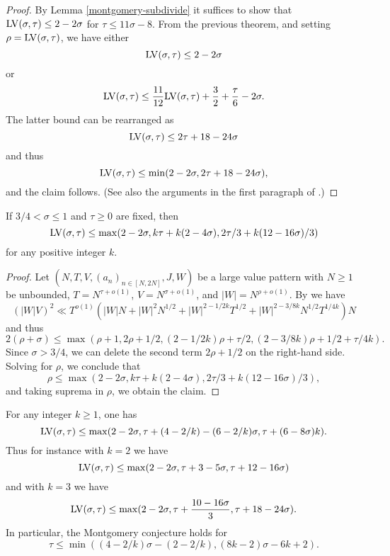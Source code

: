 \begin{proof}  By Lemma \ref{montgomery-subdivide} it suffices to show that $\mathrm{LV}(\sigma,\tau) \leq 2-2\sigma$ for $\tau \leq 11\sigma-8$.  From the previous theorem, and setting $\rho = \mathrm{LV}(\sigma,\tau)$, we have either
$$ \mathrm{LV}(\sigma,\tau) \leq 2-2\sigma$$
or
$$ \mathrm{LV}(\sigma,\tau) \leq \frac{11}{12}\mathrm{LV}(\sigma,\tau) + \frac{3}{2} + \frac{\tau}{6} - 2\sigma.$$
The latter bound can be rearranged as
$$ \mathrm{LV}(\sigma,\tau) \leq 2\tau + 18 - 24\sigma$$
and thus
$$ \mathrm{LV}(\sigma,\tau) \leq \min( 2-2\sigma, 2\tau + 18 - 24\sigma),$$
and the claim follows.  (See also the arguments in the first paragraph of \cite[p. 226]{heathbrown_zero_1979}.)
\end{proof}


\begin{lemma}\label{hb-lvt-2} If $3/4 < \sigma \leq 1$ and $\tau \geq 0$ are fixed, then
    $$ \mathrm{LV}(\sigma,\tau) \leq \max( 2-2\sigma, k\tau + k(2-4\sigma), 2\tau/3 + k(12-16\sigma)/3 )$$
    for any positive integer $k$.
    \end{lemma}

\begin{proof} Let $(N,T,V,(a_n)_{n \in [N,2N]},J,W)$ be a large value pattern with $N \geq 1$ be unbounded, $T = N^{\tau + o(1)}$,  $V = N^{\sigma + o(1)}$, and $|W| = N^{\rho+o(1)}$. By \cite[Lemma~6]{heathbrown_large_1979} we have
    $$ (|W| V)^2 \ll T^{o(1)}( |W|N + |W|^2 N^{1/2} + |W|^{2-1/2k} T^{1/2} + |W|^{2-3/8k} N^{1/2} T^{1/4k}) N$$
and thus
$$ 2(\rho + \sigma) \leq \max( \rho+1, 2\rho+1/2, (2-1/2k)\rho + \tau/2, (2-3/8k)\rho + 1/2 + \tau/4k).$$
Since $\sigma > 3/4$, we can delete the second term $2\rho+1/2$ on the right-hand side. Solving for $\rho$, we conclude that
$$ \rho \leq \max( 2-2\sigma, k\tau + k(2-4\sigma), 2\tau/3 + k(12-16\sigma)/3 ),$$
and taking suprema in $\rho$, we obtain the claim.
\end{proof}

\begin{theorem}\label{jutila-lvt}  For any integer $k \geq 1$, one has
$$ \mathrm{LV}(\sigma,\tau) \leq \max(2-2\sigma, \tau + (4-2/k) - (6-2/k)\sigma, \tau + (6-8\sigma)k).$$
Thus for instance with $k=2$ we have
$$ \mathrm{LV}(\sigma,\tau) \leq \max(2-2\sigma, \tau + 3 - 5\sigma, \tau + 12-16\sigma)$$
and with $k=3$ we have
$$ \mathrm{LV}(\sigma,\tau) \leq \max(2-2\sigma, \tau + \frac{10-16\sigma}{3}, \tau + 18-24\sigma).$$
In particular, the Montgomery conjecture holds for
$$ \tau \leq \min( (4-2/k)\sigma - (2-2/k), (8k-2)\sigma - 6k + 2).$$
\end{theorem}

